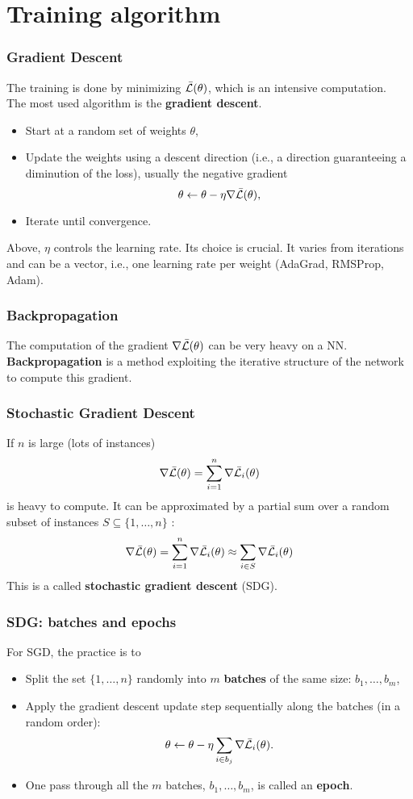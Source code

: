 \section{Training algorithm}
\begin{frame}
\frametitle{Gradient Descent}
The training is done by minimizing $\bar{\cal L}(\theta)$, which is an intensive computation.\\ 
\vspace{0.3cm}
The most used algorithm is the {\bf gradient descent}. 
\begin{itemize}
\item Start at a random set of weights $\theta$,
\item Update the weights using a descent direction (i.e., a direction guaranteeing a diminution of the loss), usually the negative gradient 
$$
\theta \leftarrow \theta - \eta \nabla \bar{\cal L}(\theta),
$$ 
\item Iterate until convergence.
\end{itemize}
Above, $\eta$ controls the learning rate. Its choice is crucial. It varies from iterations and can be a vector, i.e., one learning rate per weight (AdaGrad, RMSProp, Adam). 
\end{frame}
\begin{frame}
\frametitle{Backpropagation}
The computation of the gradient $\nabla \bar{\cal L}(\theta)$ can be very heavy on a NN.\\ 
\vspace{0.3cm}
{\bf Backpropagation} is a method exploiting the iterative structure of the network to compute this gradient. 
\end{frame}
\begin{frame}
\frametitle{Stochastic Gradient Descent}
If $n$ is large (lots of instances) 
$$
\nabla \bar{\cal L}(\theta)=\sum_{i=1}^n \nabla \bar{\cal L}_i(\theta)
$$ 
is heavy to compute. It can be approximated by a partial sum over a random subset of instances $S\subseteq \{1,\ldots,n\}$ : 
$$
\nabla \bar{\cal L}(\theta)=\sum_{i=1}^n \nabla \bar{\cal L}_i(\theta) \approx \sum_{i \in S} \nabla \bar{\cal L}_i(\theta)
$$ 
This is a called {\bf stochastic gradient descent} (SDG). 
\end{frame}
\begin{frame}
\frametitle{SDG: batches and epochs}
For SGD, the practice is to
\begin{itemize}
\item Split the set $\{1,\ldots,n\}$ randomly into $m$ {\bf batches} of the same size: $b_1,\ldots,b_m$,
\item Apply the gradient descent update step sequentially along the batches (in a random order):
$$
\theta \leftarrow \theta - \eta \sum_{i \in b_j} \nabla \bar{\cal L}_i(\theta).
$$ 
\item One pass through all the $m$ batches, $b_1,\ldots,b_m$, is called an {\bf epoch}.
\end{itemize}
\end{frame}
